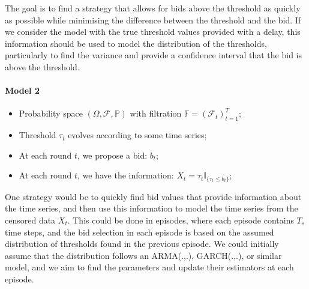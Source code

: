 \documentclass[11pt]{article}
\begin{document}
The goal is to find a strategy that allows for bids above the threshold as quickly as possible while minimising the difference 
between the threshold and the bid. 
If we consider the model with the true threshold values provided with a delay, this information should be used to model the 
distribution of the thresholds, particularly to find the variance and provide a confidence interval that the bid is above the threshold.

\paragraph*{Model 2}

\begin{itemize}
  \item Probability space $(\Omega, \mathcal{F}, \mathbb{P})$ with filtration $\mathbb{F} = (\mathcal{F}_t)_{t=1}^T$;
  \item Threshold $\tau_t$ evolves according to some time series;
  \item At each round $t$, we propose a bid: $b_t$;
  \item At each round $t$, we have the information: $X_t = \tau_t \mathbb{I}_{\{\tau_t \leq b_t\}}$;
\end{itemize}

One strategy would be to quickly find bid values that provide information about the time series, and then use this information to model the time series 
from the censored data $X_t$. This could be done in episodes, where each episode contains $T_s$ time steps, and the bid selection in each episode is based on 
the assumed distribution of thresholds found in the previous episode. We could initially assume that the distribution follows an ARMA(.,.), GARCH(.,.), 
or similar model, and we aim to find the parameters and update their estimators at each episode.

\newpage

\end{document}
